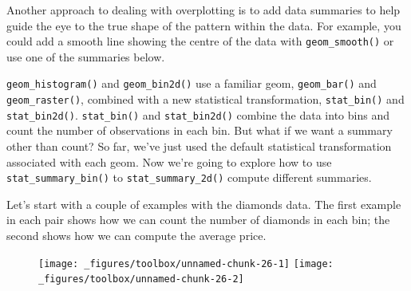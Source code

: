 Another approach to dealing with overplotting is to add data summaries
to help guide the eye to the true shape of the pattern within the data.
For example, you could add a smooth line showing the centre of the data
with \texttt{geom\_smooth()} or use one of the summaries below.


 

\texttt{geom\_histogram()} and \texttt{geom\_bin2d()} use a familiar
geom, \texttt{geom\_bar()} and \texttt{geom\_raster()}, combined with a
new statistical transformation, \texttt{stat\_bin()} and
\texttt{stat\_bin2d()}. \texttt{stat\_bin()} and \texttt{stat\_bin2d()}
combine the data into bins and count the number of observations in each
bin. But what if we want a summary other than count? So far, we've just
used the default statistical transformation associated with each geom.
Now we're going to explore how to use \texttt{stat\_summary\_bin()} to
\texttt{stat\_summary\_2d()} compute different summaries.

Let's start with a couple of examples with the diamonds data. The first
example in each pair shows how we can count the number of diamonds in
each bin; the second shows how we can compute the average price.

\begin{Shaded}
\begin{Highlighting}[]
\StringTok{ }
\StringTok{  }\NormalTok{()}

\StringTok{ }
\StringTok{  }\NormalTok{(} \NormalTok{, } 
\end{Highlighting}
\end{Shaded}

\begin{figure}[H]
  \texttt{[image: \_figures/toolbox/unnamed-chunk-26-1]}%
  \texttt{[image: \_figures/toolbox/unnamed-chunk-26-2]}
\end{figure}

